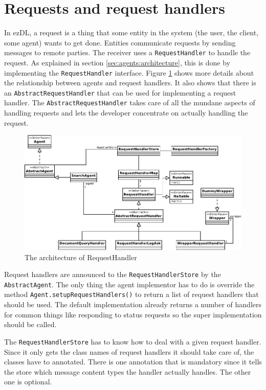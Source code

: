 \documentclass[12pt]{book}
\begin{document}
\section{Requests and request handlers}

In ezDL, a request is a thing that some entity in the system (the user, the client, some agent) wants to get done. Entities communicate requests by sending messages to remote parties. The receiver uses a {\tt RequestHandler} to handle the request. As explained in section \ref{sec:agents:architecture}, this is done by implementing the {\tt RequestHandler} interface. Figure \ref{fig:requesthandlerarchitecture} shows more details about the relationship between agents and request handlers. It also shows that there is an {\tt AbstractRequestHandler} that can be used for implementing a request handler. The {\tt AbstractRequestHandler} takes care of all the mundane aspects of handling requests and lets the developer concentrate on actually handling the request.


\begin{figure}[t]
\begin{center}
  \includegraphics[width=.75\linewidth]{RequestHandlers}
  \caption{The architecture of RequestHandler}
  \label{fig:requesthandlerarchitecture}
\end{center}
\end{figure}

Request handlers are announced to the {\tt RequestHandlerStore} by the {\tt AbstractAgent}. The only thing the agent implementor has to do is override the method {\tt Agent.setupRequestHandlers()} to return a list of request handlers that should be used. The default implementation already returns a number of handlers for common things like responding to status requests so the super implementation should be called. 

The {\tt RequestHandlerStore} has to know how to deal with a given request handler. Since it only gets the class names of request handlers it should take care of, the classes have to annotated. There is one annotation that is mandatory since it tells the store which message content types the handler actually handles. The other one is optional.
\end{document}
